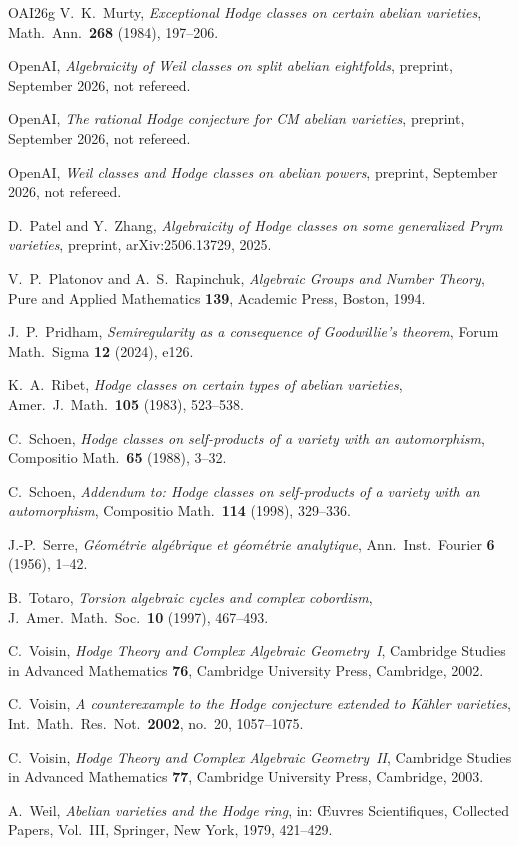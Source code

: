 \begin{thebibliography}{OAI26g}
V.~K.~Murty, \emph{Exceptional Hodge classes on certain abelian varieties},
Math.\ Ann.\ \textbf{268} (1984), 197--206.

OpenAI, \emph{Algebraicity of Weil classes on split abelian eightfolds},
preprint, September 2026, not refereed.

OpenAI, \emph{The rational Hodge conjecture for CM abelian varieties},
preprint, September 2026, not refereed.

OpenAI, \emph{Weil classes and Hodge classes on abelian powers}, preprint,
September 2026, not refereed.

D.~Patel and Y.~Zhang, \emph{Algebraicity of Hodge classes on some
generalized Prym varieties}, preprint, arXiv:2506.13729, 2025.

V.~P.~Platonov and A.~S.~Rapinchuk, \emph{Algebraic Groups and Number
Theory}, Pure and Applied Mathematics \textbf{139}, Academic Press, Boston,
1994.

J.~P.~Pridham, \emph{Semiregularity as a consequence of Goodwillie's
theorem}, Forum Math.\ Sigma \textbf{12} (2024), e126.

K.~A.~Ribet, \emph{Hodge classes on certain types of abelian varieties},
Amer.\ J.\ Math.\ \textbf{105} (1983), 523--538.

C.~Schoen, \emph{Hodge classes on self-products of a variety with an
automorphism}, Compositio Math.\ \textbf{65} (1988), 3--32.

C.~Schoen, \emph{Addendum to: Hodge classes on self-products of a variety
with an automorphism}, Compositio Math.\ \textbf{114} (1998), 329--336.

J.-P.~Serre, \emph{G\'eom\'etrie alg\'ebrique et g\'eom\'etrie analytique},
Ann.\ Inst.\ Fourier \textbf{6} (1956), 1--42.

B.~Totaro, \emph{Torsion algebraic cycles and complex cobordism}, J.\
Amer.\ Math.\ Soc.\ \textbf{10} (1997), 467--493.

C.~Voisin, \emph{Hodge Theory and Complex Algebraic Geometry~I}, Cambridge
Studies in Advanced Mathematics \textbf{76}, Cambridge University Press,
Cambridge, 2002.

C.~Voisin, \emph{A counterexample to the Hodge conjecture extended to
K\"ahler varieties}, Int.\ Math.\ Res.\ Not.\ \textbf{2002}, no.~20,
1057--1075.

C.~Voisin, \emph{Hodge Theory and Complex Algebraic Geometry~II}, Cambridge
Studies in Advanced Mathematics \textbf{77}, Cambridge University Press,
Cambridge, 2003.

A.~Weil, \emph{Abelian varieties and the Hodge ring}, in: \OE uvres
Scientifiques, Collected Papers, Vol.~III, Springer, New York, 1979,
421--429.

\end{thebibliography}
